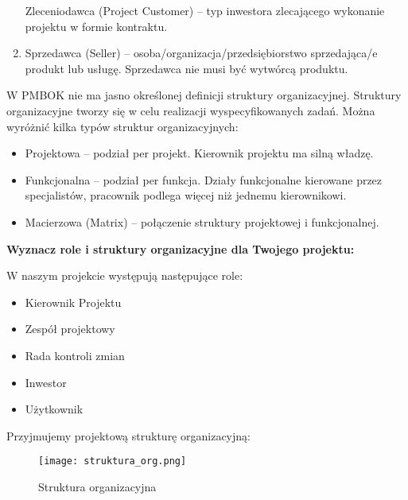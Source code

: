 \begin{enumerate}
Zleceniodawca (Project Customer) – typ inwestora zlecającego wykonanie projektu w formie kontraktu. 
\item	Sprzedawca (Seller) – osoba/organizacja/przedsiębiorstwo sprzedająca/e produkt lub usługę. Sprzedawca nie musi być wytwórcą produktu.
\end{enumerate}

W PMBOK nie ma jasno określonej definicji struktury organizacyjnej. Struktury organizacyjne tworzy się w celu realizacji wyspecyfikowanych zadań. Można wyróżnić kilka typów struktur organizacyjnych:
\begin{itemize}
\item	Projektowa – podział per projekt. Kierownik projektu ma silną władzę. 
\item	Funkcjonalna – podział per funkcja. Działy funkcjonalne kierowane przez specjalistów, pracownik podlega więcej niż jednemu kierownikowi.
\item	Macierzowa (Matrix) – połączenie struktury projektowej i funkcjonalnej.
\end{itemize}


\textbf{Wyznacz role i struktury organizacyjne dla Twojego projektu:}


W naszym projekcie występują następujące role:
\begin{itemize}
\item Kierownik Projektu
\item Zespół projektowy
\item Rada kontroli zmian
\item Inwestor
\item Użytkownik
\end{itemize}


Przyjmujemy projektową strukturę organizacyjną:
\begin{figure}[!ht]
\begin{center}
\texttt{[image: struktura\_org.png]}
\caption[Struktura organizacyjna]{Struktura organizacyjna}
\label{rysunekProces}
\end{center}
\end{figure}




